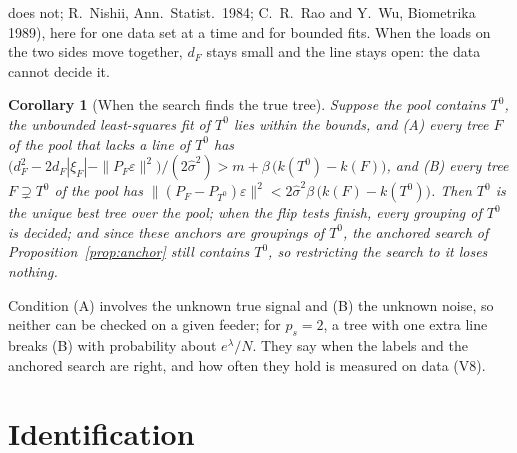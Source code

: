 \documentclass[journal,onecolumn,11pt]{IEEEtran}
\newtheorem{corollary}{Corollary}
\begin{document}
does not; R.~Nishii, Ann.\ Statist.\ 1984; C.~R.~Rao and Y.~Wu, Biometrika 1989), here for one data set at a time and for
bounded fits. When the loads on the two sides move together, $d_F$ stays small and the line
stays open: the data cannot decide it.
\begin{corollary}[When the search finds the true tree]\label{cor:truth}
Suppose the pool contains $T^0$, the unbounded least-squares fit of $T^0$ lies within the bounds, and (A) every tree $F$ of
the pool that lacks a line of $T^0$ has
$\big(d_F^2-2d_F|\xi_F|-\|P_F\varepsilon\|^2\big)/(2\hat\sigma^2)>m+\beta\,\big(k(T^0)-k(F)\big)$, and (B) every tree
$F\supsetneq T^0$ of the pool has $\|(P_F-P_{T^0})\varepsilon\|^2<2\hat\sigma^2\beta\,\big(k(F)-k(T^0)\big)$. Then $T^0$ is the unique best tree over the pool;
when the flip tests finish, every grouping of $T^0$ is decided; and since these anchors are groupings of $T^0$, the anchored
search of Proposition~\ref{prop:anchor} still contains $T^0$, so restricting the search to it loses nothing.
\end{corollary}
Condition (A) involves the unknown true signal and (B) the unknown noise, so neither can be checked on a given feeder; for
$p_s=2$, a tree with one extra line breaks (B) with probability about $e^{\lambda}/N$. They say when the labels and the
anchored search are right, and how often they hold is measured on data (V8).

\section{Identification}\label{sec:id}
\end{document}
